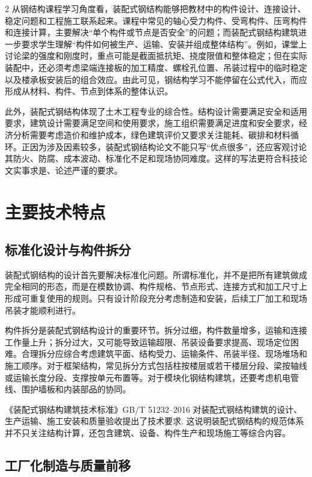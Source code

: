 \documentclass[UTF8,a4paper,10.5pt]{ctexart}
\begin{document}
\begin{multicols}{2}
从钢结构课程学习角度看，装配式钢结构能够把教材中的构件设计、连接设计、稳定问题和工程施工联系起来。课程中常见的轴心受力构件、受弯构件、压弯构件和连接计算，主要解决“单个构件或节点是否安全”的问题；而装配式钢结构建筑进一步要求学生理解“构件如何被生产、运输、安装并组成整体结构”。例如，课堂上讨论梁的强度和刚度时，重点可能是截面抵抗矩、挠度限值和整体稳定；但在实际装配中，还必须考虑梁端连接板的加工精度、螺栓孔位置、吊装过程中的临时稳定以及楼承板安装后的组合效应。由此可见，钢结构学习不能停留在公式代入，而应形成从材料、构件、节点到体系的整体认识。

此外，装配式钢结构体现了土木工程专业的综合性。结构设计需要满足安全和适用要求，建筑设计需要满足空间和使用要求，施工组织需要满足进度和安全要求，经济分析需要考虑造价和维护成本，绿色建筑评价又要求关注能耗、碳排和材料循环。正因为涉及因素较多，装配式钢结构论文不能只写“优点很多”，还应客观讨论其防火、防腐、成本波动、标准化不足和现场协同难度。这样的写法更符合科技论文实事求是、论述严谨的要求。

\section{主要技术特点}

\subsection{标准化设计与构件拆分}

装配式钢结构的设计首先要解决标准化问题。所谓标准化，并不是把所有建筑做成完全相同的形态，而是在模数协调、构件规格、节点形式、连接方式和加工尺寸上形成可重复使用的规则。只有设计阶段充分考虑制造和安装，后续工厂加工和现场吊装才能顺利进行。

构件拆分是装配式钢结构设计的重要环节。拆分过细，构件数量增多，运输和连接工作量上升；拆分过大，又可能导致运输超限、吊装设备要求提高、现场定位困难。合理拆分应综合考虑建筑平面、结构受力、运输条件、吊装半径、现场堆场和施工顺序。对于框架结构，常见拆分方式包括柱按楼层或若干楼层分段、梁按轴线或运输长度分段、支撑按单元布置等。对于模块化钢结构建筑，还要考虑机电管线、围护墙板和内装部品的协同。

《装配式钢结构建筑技术标准》GB/T 51232--2016 对装配式钢结构建筑的设计、生产运输、施工安装和质量验收提出了技术要求\cite{ref-gbt51232}. 这说明装配式钢结构的规范体系并不只关注结构计算，还包含建筑、设备、构件生产和现场施工等综合内容。

\subsection{工厂化制造与质量前移}


\end{multicols}
\end{document}
